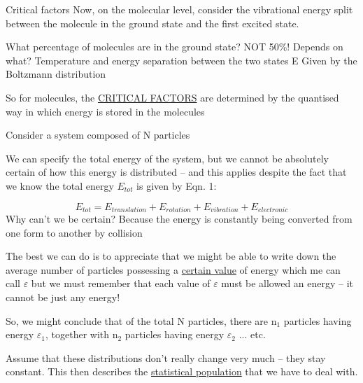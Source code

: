 \documentclass[a4paper,12pt,titlepage]{article}
\begin{document}
\begin{frame}{Critical factors}
Now, on the molecular level, consider the vibrational energy split between the molecule in the ground state and the first excited state.


What percentage of molecules are in the ground state? NOT 50\%!\newline
Depends on what? Temperature and energy separation between the two states E\newline
Given by the Boltzmann distribution\newline

So for molecules, the \underline{CRITICAL FACTORS} are determined by the quantised way in which energy is stored in the molecules
\end{frame}

\begin{frame}[allowframebreaks=0.6]
Consider a system composed of N particles\par
We can specify the total energy of the system, but we cannot be absolutely certain of how this energy is distributed -- and this applies despite the fact that we know the total energy \(E_{tot}\) is given by Eqn. 1:\par
\[E_{tot} = E_{translation} + E_{rotation} + E_{vibration} + E_{electronic}\]
Why can't we be certain? Because the energy is constantly being converted from one form to another by collision\par
The best we can do is to appreciate that we might be able to write down the average number of particles possessing a \underline{certain value} of energy which me can call \(\varepsilon\) but we must remember that each value of \(\varepsilon\) must be allowed an energy -- it cannot be just any energy!\par
So, we might conclude that of the total N particles, there are n\(_1\) particles having energy \(\varepsilon_1\), together with n\(_2\) particles having energy \(\varepsilon_2\) ... etc.\par
Assume that these distributions don't really change very much -- they stay constant. This then describes the \underline{statistical population} that we have to deal with.
\end{frame}
\end{document}
